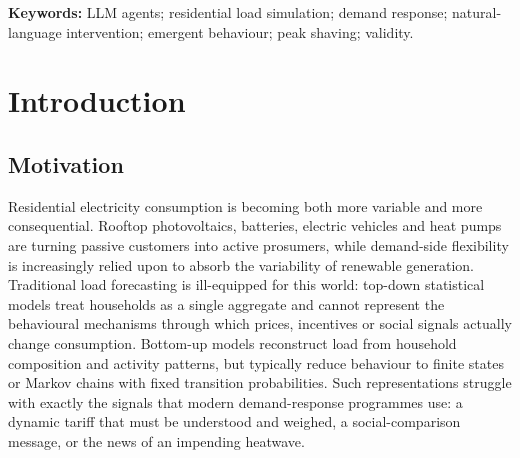 \documentclass[11pt]{article}
\begin{document}
\begin{abstract}
significant peak reduction ($-8.1\%$). Finally, we show that peak shaving obeys a mechanism bounded by
appliance \emph{substitutability}: a device-targeted intervention shaves the total peak only for
non-substitutable devices (air-conditioning) and not for substitutable ones (induction cooking, which the
agent relocates to the oven and microwave). An adversarial self-audit withdraws one previously claimed
peak-shaving result that does not survive a shared-timeline replication, shows that all headline
$p$-values survive Benjamini--Hochberg correction, and classifies each finding as robust, prompt-sensitive
or withdrawn. We conclude by arguing that the calibrated \emph{capability boundary} of LLM-driven energy
simulation --- not any single effect size --- is the contribution that makes it trustworthy as a
policy-experiment instrument.
\end{abstract}

\noindent\textbf{Keywords:} LLM agents; residential load simulation; demand response; natural-language
intervention; emergent behaviour; peak shaving; validity.

\section{Introduction}

\subsection{Motivation}
Residential electricity consumption is becoming both more variable and more consequential. Rooftop
photovoltaics, batteries, electric vehicles and heat pumps are turning passive customers into active
prosumers, while demand-side flexibility is increasingly relied upon to absorb the variability of
renewable generation. Traditional load forecasting is ill-equipped for this world: top-down statistical
models treat households as a single aggregate and cannot represent the behavioural mechanisms through
which prices, incentives or social signals actually change consumption. Bottom-up models
\cite{capasso1994,widen2010,richardson2010} reconstruct load from household composition and activity
patterns, but typically reduce behaviour to finite states or Markov chains with fixed transition
probabilities. Such representations struggle with exactly the signals that modern demand-response
programmes use: a dynamic tariff that must be understood and weighed, a social-comparison message, or the
news of an impending heatwave.
\end{document}
